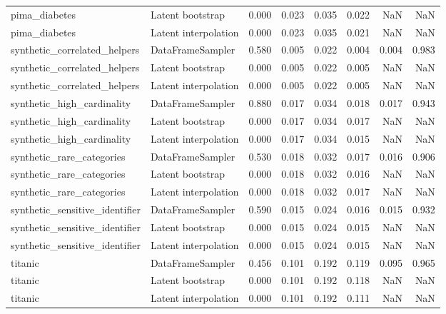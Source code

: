 \begin{table}
\begin{adjustbox}{max width=\textwidth}
\begin{tabular}{llrrrrrr}
pima\_diabetes & Latent bootstrap & 0.000 & 0.023 & 0.035 & 0.022 & NaN & NaN \\
pima\_diabetes & Latent interpolation & 0.000 & 0.023 & 0.035 & 0.021 & NaN & NaN \\
synthetic\_correlated\_helpers & DataFrameSampler & 0.580 & 0.005 & 0.022 & 0.004 & 0.004 & 0.983 \\
synthetic\_correlated\_helpers & Latent bootstrap & 0.000 & 0.005 & 0.022 & 0.005 & NaN & NaN \\
synthetic\_correlated\_helpers & Latent interpolation & 0.000 & 0.005 & 0.022 & 0.005 & NaN & NaN \\
synthetic\_high\_cardinality & DataFrameSampler & 0.880 & 0.017 & 0.034 & 0.018 & 0.017 & 0.943 \\
synthetic\_high\_cardinality & Latent bootstrap & 0.000 & 0.017 & 0.034 & 0.017 & NaN & NaN \\
synthetic\_high\_cardinality & Latent interpolation & 0.000 & 0.017 & 0.034 & 0.015 & NaN & NaN \\
synthetic\_rare\_categories & DataFrameSampler & 0.530 & 0.018 & 0.032 & 0.017 & 0.016 & 0.906 \\
synthetic\_rare\_categories & Latent bootstrap & 0.000 & 0.018 & 0.032 & 0.016 & NaN & NaN \\
synthetic\_rare\_categories & Latent interpolation & 0.000 & 0.018 & 0.032 & 0.017 & NaN & NaN \\
synthetic\_sensitive\_identifier & DataFrameSampler & 0.590 & 0.015 & 0.024 & 0.016 & 0.015 & 0.932 \\
synthetic\_sensitive\_identifier & Latent bootstrap & 0.000 & 0.015 & 0.024 & 0.015 & NaN & NaN \\
synthetic\_sensitive\_identifier & Latent interpolation & 0.000 & 0.015 & 0.024 & 0.015 & NaN & NaN \\
titanic & DataFrameSampler & 0.456 & 0.101 & 0.192 & 0.119 & 0.095 & 0.965 \\
titanic & Latent bootstrap & 0.000 & 0.101 & 0.192 & 0.118 & NaN & NaN \\
titanic & Latent interpolation & 0.000 & 0.101 & 0.192 & 0.111 & NaN & NaN \\
\bottomrule
\end{tabular}
\end{adjustbox}
\end{table}
